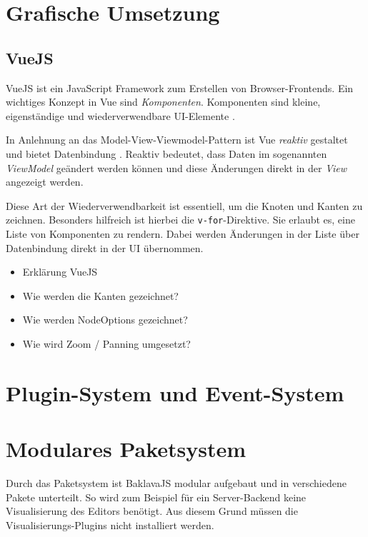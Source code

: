 \section{Grafische Umsetzung}

\subsection{VueJS}
VueJS ist ein JavaScript Framework zum Erstellen von Browser-Frontends. Ein wichtiges Konzept in Vue sind \textit{Komponenten}. Komponenten sind kleine, eigenständige und wiederverwendbare UI-Elemente \cite{vue:components}.

In Anlehnung an das Model-View-Viewmodel-Pattern ist Vue \textit{reaktiv} gestaltet und bietet Datenbindung \cite{vue:instance}. Reaktiv bedeutet, dass Daten im sogenannten \textit{ViewModel} geändert werden können und diese Änderungen direkt in der \textit{View} angezeigt werden. 

Diese Art der Wiederverwendbarkeit ist essentiell, um die Knoten und Kanten zu zeichnen. Besonders hilfreich ist hierbei die \texttt{v-for}-Direktive. Sie erlaubt es, eine Liste von Komponenten zu rendern. Dabei werden Änderungen in der Liste über Datenbindung direkt in der UI übernommen. 



\begin{itemize}
    \item Erklärung VueJS
    \item Wie werden die Kanten gezeichnet?
    \item Wie werden NodeOptions gezeichnet?
    \item Wie wird Zoom / Panning umgesetzt?
\end{itemize}

\section{Plugin-System und Event-System}

\section{Modulares Paketsystem}


Durch das Paketsystem ist BaklavaJS modular aufgebaut und in verschiedene Pakete unterteilt. So wird zum Beispiel für ein Server-Backend keine Visualisierung des Editors benötigt. Aus diesem Grund müssen die Visualisierungs-Plugins nicht installiert werden.

